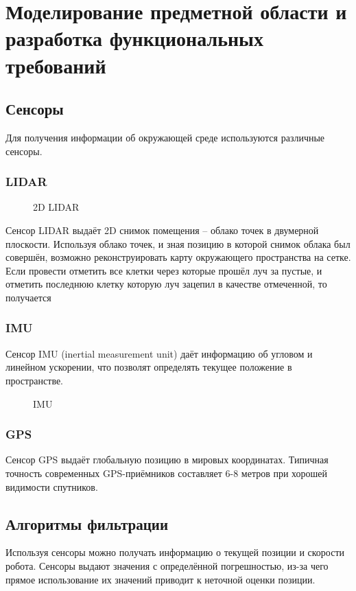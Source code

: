 \section{Моделирование предметной области и разработка функциональных
требований}

{
\renewcommand{\mathbf}[1]{#1}
\subsection{Сенсоры}

Для получения информации об окружающей среде используются различные сенсоры.

\subsubsection{LIDAR}

\begin{figure}[h]
\centering
\caption{2D LIDAR}
\end{figure}

Сенсор LIDAR выдаёт 2D снимок помещения -- облако точек в двумерной плоскости.
Используя облако точек, и зная позицию в которой снимок облака был совершён,
возможно реконструировать карту окружающего пространства на сетке. Если провести
отметить все клетки через которые прошёл луч за пустые, и отметить последнюю
клетку которую луч зацепил в качестве отмеченной, то получается 

\subsubsection{IMU}
Сенсор IMU (inertial measurement unit) даёт информацию об угловом и линейном
ускорении, что позволят определять текущее положение в пространстве.

\begin{figure}[h]
\centering
\caption{IMU}
\end{figure}

\subsubsection{GPS}
Сенсор GPS выдаёт глобальную позицию в мировых координатах. Типичная точность
современных GPS-приёмников составляет 6-8 метров при хорошей видимости
спутников. 

\subsection{Алгоритмы фильтрации}
Используя сенсоры можно получать информацию о текущей позиции и скорости робота.
Сенсоры выдают значения с определённой погрешностью, из-за чего прямое
использование их значений приводит к неточной оценки позиции.

}
